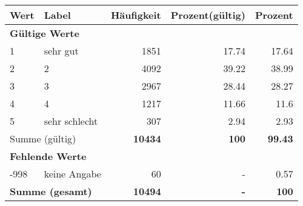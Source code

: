      \begin{longtable}{lXrrr}
     \toprule
     \textbf{Wert} & \textbf{Label} & \textbf{Häufigkeit} & \textbf{Prozent(gültig)} & \textbf{Prozent} \\
     \endhead
     \midrule
     \multicolumn{5}{l}{\textbf{Gültige Werte}}\\

     1 &
     \multicolumn{1}{X}{ sehr gut   } &


       \num{1851} &
       \num[round-mode=places,round-precision=2]{17.74} &
         \num[round-mode=places,round-precision=2]{17.64} \\

     2 &
     \multicolumn{1}{X}{ 2   } &


       \num{4092} &
       \num[round-mode=places,round-precision=2]{39.22} &
         \num[round-mode=places,round-precision=2]{38.99} \\

     3 &
     \multicolumn{1}{X}{ 3   } &


       \num{2967} &
       \num[round-mode=places,round-precision=2]{28.44} &
         \num[round-mode=places,round-precision=2]{28.27} \\

     4 &
     \multicolumn{1}{X}{ 4   } &


       \num{1217} &
       \num[round-mode=places,round-precision=2]{11.66} &
         \num[round-mode=places,round-precision=2]{11.6} \\

     5 &
     \multicolumn{1}{X}{ sehr schlecht   } &


       \num{307} &
       \num[round-mode=places,round-precision=2]{2.94} &
         \num[round-mode=places,round-precision=2]{2.93} \\
     \midrule
     \multicolumn{2}{l}{Summe (gültig)} &
       \textbf{\num{10434}} &
     \textbf{\num{100}} &
       \textbf{\num[round-mode=places,round-precision=2]{99.43}} \\
     \multicolumn{5}{l}{\textbf{Fehlende Werte}}\\
       -998 &
       keine Angabe &
         \num{60} &
        - &
         \num[round-mode=places,round-precision=2]{0.57} \\
     \midrule
     \multicolumn{2}{l}{\textbf{Summe (gesamt)}} &
          \textbf{\num{10494}} &
        \textbf{-} &
        \textbf{\num{100}} \\
     \bottomrule
     \end{longtable}
     
